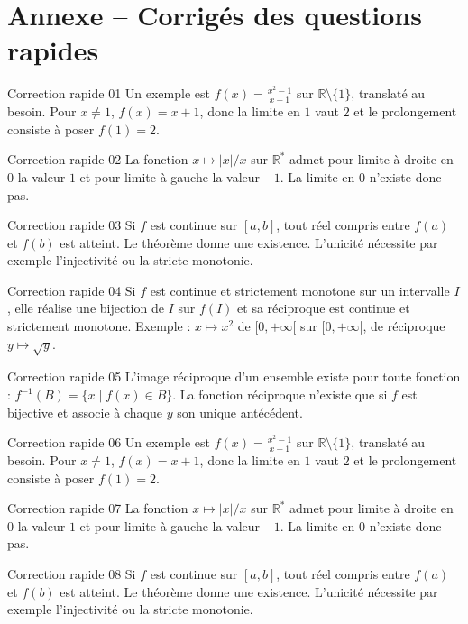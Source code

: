 \documentclass[11pt,a4paper]{article}
\newcommand{\R}{\mathbb{R}}
\begin{document}
\section{Annexe -- Corrigés des questions rapides}
\begin{corrbox}{Correction rapide 01}
Un exemple est $f(x)=\frac{x^2-1}{x-1}$ sur $\R\setminus\{1\}$, translaté au besoin. Pour $x\neq1$, $f(x)=x+1$, donc la limite en $1$ vaut $2$ et le prolongement consiste à poser $f(1)=2$.
\end{corrbox}
\begin{corrbox}{Correction rapide 02}
La fonction $x\mapsto |x|/x$ sur $\R^*$ admet pour limite à droite en $0$ la valeur $1$ et pour limite à gauche la valeur $-1$. La limite en $0$ n'existe donc pas.
\end{corrbox}
\begin{corrbox}{Correction rapide 03}
Si $f$ est continue sur $[a,b]$, tout réel compris entre $f(a)$ et $f(b)$ est atteint. Le théorème donne une existence. L'unicité nécessite par exemple l'injectivité ou la stricte monotonie.
\end{corrbox}
\begin{corrbox}{Correction rapide 04}
Si $f$ est continue et strictement monotone sur un intervalle $I$, elle réalise une bijection de $I$ sur $f(I)$ et sa réciproque est continue et strictement monotone. Exemple : $x\mapsto x^2$ de $[0,+\infty[$ sur $[0,+\infty[$, de réciproque $y\mapsto\sqrt y$.
\end{corrbox}
\begin{corrbox}{Correction rapide 05}
L'image réciproque d'un ensemble existe pour toute fonction : $f^{-1}(B)=\{x\mid f(x)\in B\}$. La fonction réciproque n'existe que si $f$ est bijective et associe à chaque $y$ son unique antécédent.
\end{corrbox}
\begin{corrbox}{Correction rapide 06}
Un exemple est $f(x)=\frac{x^2-1}{x-1}$ sur $\R\setminus\{1\}$, translaté au besoin. Pour $x\neq1$, $f(x)=x+1$, donc la limite en $1$ vaut $2$ et le prolongement consiste à poser $f(1)=2$.
\end{corrbox}
\begin{corrbox}{Correction rapide 07}
La fonction $x\mapsto |x|/x$ sur $\R^*$ admet pour limite à droite en $0$ la valeur $1$ et pour limite à gauche la valeur $-1$. La limite en $0$ n'existe donc pas.
\end{corrbox}
\begin{corrbox}{Correction rapide 08}
Si $f$ est continue sur $[a,b]$, tout réel compris entre $f(a)$ et $f(b)$ est atteint. Le théorème donne une existence. L'unicité nécessite par exemple l'injectivité ou la stricte monotonie.
\end{corrbox}
\end{document}

